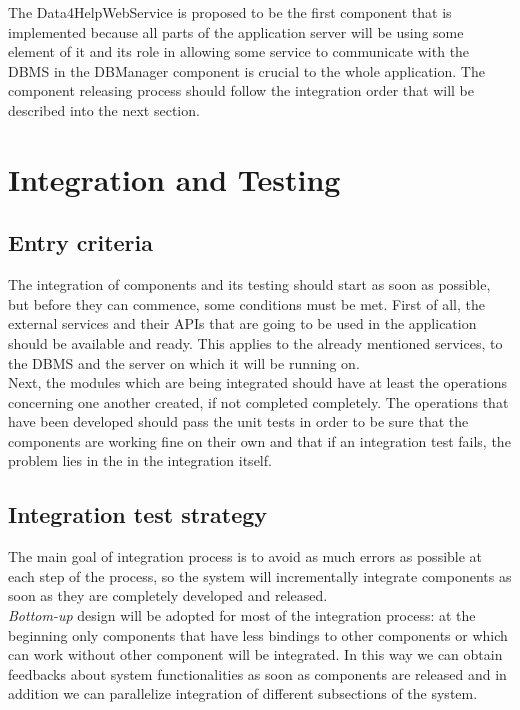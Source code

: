 \documentclass[a4paper, hidelinks, 12pt]{report}
\begin{document}
The Data4HelpWebService is proposed to be the first component that is implemented because all parts of the application server will be using some element of it and its role in allowing some service to communicate with the DBMS in the DBManager component is crucial to the whole application. The component releasing process should follow the integration order that will be described into the next section.

\section{Integration and Testing}
\subsection{Entry criteria} 
The integration of components and its testing should start as soon as possible, but before they can commence, some conditions must be met. First of all, the external services and their APIs that are going to be used in the application should be available and ready. This applies to the already mentioned services, to the DBMS and the server on which it will be running on. \\

Next, the modules which are being integrated should have at least the operations concerning one another created, if not completed completely. The operations that have been developed should pass the unit tests in order to be sure that the components are working fine on their own and that if an integration test fails, the problem lies in the in the integration itself.\\

\subsection{Integration test strategy}  
The main goal of integration process is to avoid as much
errors as possible at each step of the process, so the system will incrementally integrate components as soon as they are completely developed and released.\\

\textit{Bottom-up} design will be adopted for most of the integration process: at the beginning only components that have less bindings to other components or which can work without other component will be integrated. In this way we can obtain feedbacks
about system functionalities as soon as components are released and in addition we can parallelize integration of different subsections of the system.\\
\end{document}
